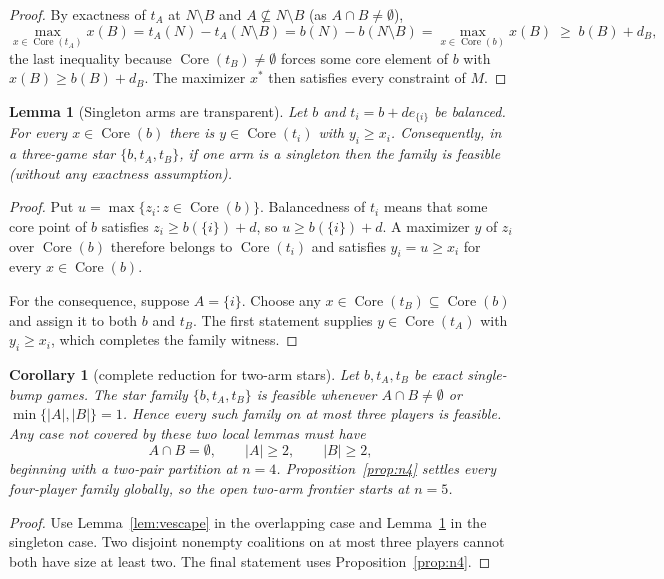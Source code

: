 \documentclass[11pt]{article}
\newtheorem{lemma}[theorem]{Lemma}
\newtheorem{corollary}[theorem]{Corollary}
\newcommand{\core}{\operatorname{Core}}
\begin{document}
\begin{proof}
By exactness of $t_A$ at $N\setminus B$ and $A\not\subseteq N\setminus B$
(as $A\cap B\neq\emptyset$),
\[
\max_{x\in\core(t_A)}x(B)
= t_A(N)-t_A(N\setminus B)
= b(N)-b(N\setminus B)
= \max_{x\in\core(b)}x(B)\;\ge\; b(B)+d_B,
\]
the last inequality because $\core(t_B)\neq\emptyset$ forces some core
element of $b$ with $x(B)\ge b(B)+d_B$. The maximizer $x^*$ then satisfies
every constraint of $M$.
\end{proof}

\begin{lemma}[Singleton arms are transparent]\label{lem:singleton-arm}
Let $b$ and $t_i=b+d e_{\{i\}}$ be balanced.  For every
$x\in\core(b)$ there is $y\in\core(t_i)$ with $y_i\geq x_i$.
Consequently, in a three-game star
$\{b,t_A,t_B\}$, if one arm is a singleton then the family is feasible
(without any exactness assumption).
\end{lemma}

\begin{proof}
Put $u=\max\{z_i:z\in\core(b)\}$.  Balancedness of $t_i$ means that
some core point of $b$ satisfies $z_i\geq b(\{i\})+d$, so
$u\geq b(\{i\})+d$.  A maximizer $y$ of $z_i$ over $\core(b)$ therefore
belongs to $\core(t_i)$ and satisfies $y_i=u\geq x_i$ for every
$x\in\core(b)$.

For the consequence, suppose $A=\{i\}$.  Choose any
$x\in\core(t_B)\subseteq\core(b)$ and assign it to both $b$ and $t_B$.
The first statement supplies $y\in\core(t_A)$ with $y_i\geq x_i$, which
completes the family witness.
\end{proof}

\begin{corollary}[complete reduction for two-arm stars]
\label{cor:two-arm-reduction}
Let $b,t_A,t_B$ be exact single-bump games.  The star family
$\{b,t_A,t_B\}$ is feasible whenever $A\cap B\neq\emptyset$ or
$\min\{|A|,|B|\}=1$.  Hence every such family on at most three players is
feasible.  Any case not covered by these two local lemmas must have
\[
 A\cap B=\emptyset,\qquad |A|\geq2,\qquad |B|\geq2,
\]
beginning with a two-pair partition at $n=4$.  Proposition~\ref{prop:n4}
settles every four-player family globally, so the open two-arm frontier starts
at $n=5$.
\end{corollary}

\begin{proof}
Use Lemma~\ref{lem:vescape} in the overlapping case and
Lemma~\ref{lem:singleton-arm} in the singleton case.  Two disjoint nonempty
coalitions on at most three players cannot both have size at least two.
The final statement uses Proposition~\ref{prop:n4}.
\end{proof}
\end{document}
